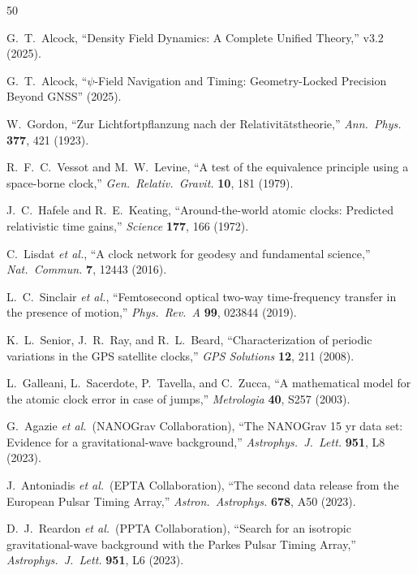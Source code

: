 \documentclass[aps,prd,twocolumn,superscriptaddress,nofootinbib,longbibliography]{revtex4-2}
\begin{document}
\begin{thebibliography}{50}

G.~T.~Alcock,
``Density Field Dynamics: A Complete Unified Theory,'' v3.2 (2025).

G.~T.~Alcock,
``$\psi$-Field Navigation and Timing: Geometry-Locked Precision Beyond GNSS''
(2025).

W.~Gordon,
``Zur Lichtfortpflanzung nach der Relativit\"atstheorie,''
\textit{Ann.\ Phys.} \textbf{377}, 421 (1923).

R.~F.~C.~Vessot and M.~W.~Levine,
``A test of the equivalence principle using a space-borne clock,''
\textit{Gen.\ Relativ.\ Gravit.} \textbf{10}, 181 (1979).

J.~C.~Hafele and R.~E.~Keating,
``Around-the-world atomic clocks: Predicted relativistic time gains,''
\textit{Science} \textbf{177}, 166 (1972).

C.~Lisdat \textit{et al.},
``A clock network for geodesy and fundamental science,''
\textit{Nat.\ Commun.} \textbf{7}, 12443 (2016).

L.~C.~Sinclair \textit{et al.},
``Femtosecond optical two-way time-frequency transfer in the presence of
motion,''
\textit{Phys.\ Rev.\ A} \textbf{99}, 023844 (2019).

K.~L.~Senior, J.~R.~Ray, and R.~L.~Beard,
``Characterization of periodic variations in the GPS satellite clocks,''
\textit{GPS Solutions} \textbf{12}, 211 (2008).

L.~Galleani, L.~Sacerdote, P.~Tavella, and C.~Zucca,
``A mathematical model for the atomic clock error in case of jumps,''
\textit{Metrologia} \textbf{40}, S257 (2003).

G.~Agazie \textit{et al.}\ (NANOGrav Collaboration),
``The NANOGrav 15 yr data set: Evidence for a gravitational-wave
background,''
\textit{Astrophys.\ J.\ Lett.} \textbf{951}, L8 (2023).

J.~Antoniadis \textit{et al.}\ (EPTA Collaboration),
``The second data release from the European Pulsar Timing Array,''
\textit{Astron.\ Astrophys.} \textbf{678}, A50 (2023).

D.~J.~Reardon \textit{et al.}\ (PPTA Collaboration),
``Search for an isotropic gravitational-wave background with the Parkes
Pulsar Timing Array,''
\textit{Astrophys.\ J.\ Lett.} \textbf{951}, L6 (2023).


\end{thebibliography}
\end{document}

